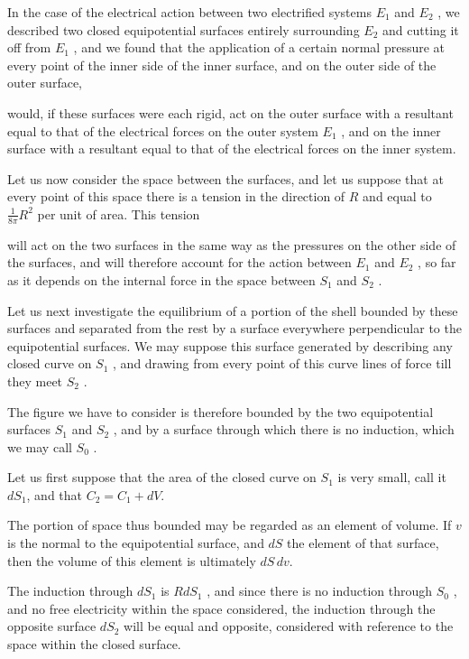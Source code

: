 \documentclass[11pt,a4paper]{article}
\begin{document}
In the case of the electrical action between two electrified systems  $E_1$  and  $E_2$ , we described two closed equipotential surfaces entirely surrounding  $E_2$  and cutting it off from  $E_1$ , and we found that the application of a certain normal pressure at every point of the inner side of the inner surface, and on the outer side of the outer surface,

would, if these surfaces were each rigid, act on the outer surface with a resultant equal to that of the electrical forces on the outer system  $E_1$ , and on the inner surface with a resultant equal to that of the electrical forces on the inner system.

Let us now consider the space between the surfaces, and let us suppose that at every point of this space there is a tension in the direction of $R$ and equal to $\frac{1}{8\pi}R^2$ per unit of area. This tension

will act on the two surfaces in the same way as the pressures on the other side of the surfaces, and will therefore account for the action between  $E_1$  and  $E_2$ , so far as it depends on the internal force in the space between  $S_1$  and  $S_2$ .

Let us next investigate the equilibrium of a portion of the shell bounded by these surfaces and separated from the rest by a surface everywhere perpendicular to the equipotential surfaces. We may suppose this surface generated by describing any closed curve on  $S_1$ , and drawing from every point of this curve lines of force till they meet  $S_2$ .

The figure we have to consider is therefore bounded by the two equipotential surfaces  $S_1$  and  $S_2$ , and by a surface through which there is no induction, which we may call  $S_0$ .

Let us first suppose that the area of the closed curve on $S_1$ is very small, call it $dS_1$, and that $C_2=C_1+dV$.

The portion of space thus bounded may be regarded as an element of volume. If $v$ is the normal to the equipotential surface, and $dS$ the element of that surface, then the volume of this element is ultimately $dS\,dv$.

The induction through  $dS_1$  is  $R dS_1$ , and since there is no induction through  $S_0$ , and no free electricity within the space considered, the induction through the opposite surface  $dS_2$  will be equal and opposite, considered with reference to the space within the closed surface.
\end{document}
